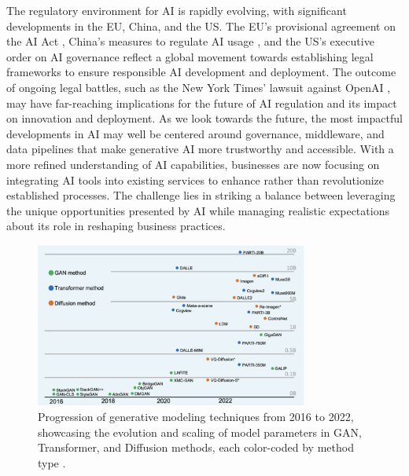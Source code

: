 \documentclass[11pt,a4paper,oneside]{report}
\begin{document}
The regulatory environment for AI is rapidly evolving, with significant developments in the EU, China, and the US. 
The EU's provisional agreement on the AI Act \cite{eu_ai_act_2023}, China's measures to regulate AI usage \cite{China_AI_Policy_2023}, and the US's executive order on AI governance \cite{WhiteHouse_AI_ExecOrder_2023} reflect a global movement towards establishing legal frameworks to ensure responsible AI development and deployment. 
The outcome of ongoing legal battles, such as the New York Times' lawsuit against OpenAI \cite{Grynbaum_Mac_2023_Times_Sues_OpenAI}, may have far-reaching implications for the future of AI regulation and its impact on innovation and deployment. 
As we look towards the future, the most impactful developments in AI may well be centered around governance, middleware, and data pipelines that make generative AI more trustworthy and accessible. 
With a more refined understanding of AI capabilities, businesses are now focusing on integrating AI tools into existing services to enhance rather than revolutionize established processes. 
The challenge lies in striking a balance between leveraging the unique opportunities presented by AI while managing realistic expectations about its role in reshaping business practices.

\begin{figure}[htbp]
  \centering
  \includegraphics[width=0.8\textwidth]{models.png}
  \caption{Progression of generative modeling techniques from 2016 to 2022, showcasing the evolution and scaling of model parameters in GAN, Transformer, and Diffusion methods, each color-coded by method type \cite{bie2023renaissance}.}
\end{figure}
\end{document}
